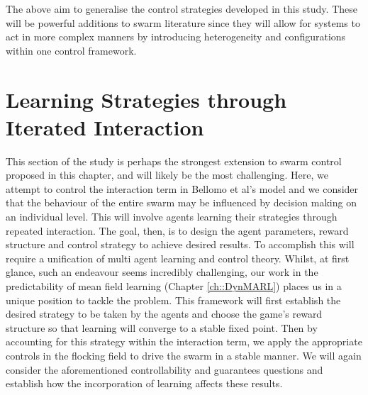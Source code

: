 \documentclass[../sample.tex]{subfiles}
\begin{document}

	The above aim to generalise the control strategies developed in this study. These will be
	powerful additions to swarm literature since they will allow for systems to act in more complex
	manners by introducing heterogeneity and configurations within one control framework. 


	\section{Learning Strategies through Iterated Interaction} %
	\label{sec:learning_strategies_through_iterated_interaction}
	
	This section of the study is perhaps the strongest extension to swarm control proposed in this
	chapter, and will likely be the most challenging. Here, we attempt to control the interaction term
	in Bellomo et al's model and we consider that the behaviour of the entire swarm may be influenced
	by decision making on an individual level. This will involve agents learning their strategies
	through repeated interaction. The goal, then, is to design the agent parameters, reward structure
	and control strategy to achieve desired results. To accomplish this will require a unification of
	multi agent learning and control theory. Whilst, at first glance, such an endeavour seems
	incredibly challenging, our work in the predictability of mean field learning (Chapter 
	\ref{ch::DynMARL}) places us in a unique position to tackle the problem. This framework will
	first establish the desired strategy to be taken by the agents and choose the game's reward
	structure so that learning will converge to a stable fixed point. Then by accounting for this
	strategy within the interaction term, we apply the appropriate controls in the flocking field to
	drive the swarm in a stable manner. We will again consider the aforementioned controllability
	and guarantees questions and establish how the incorporation of learning affects these results.

\end{document}
